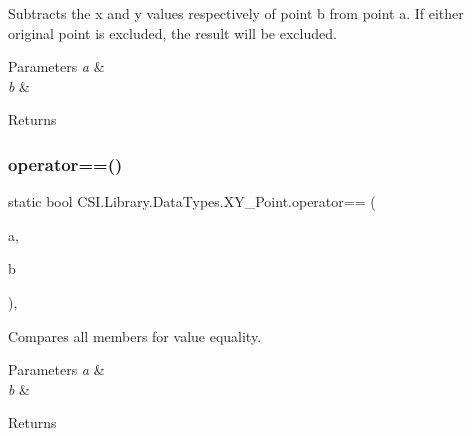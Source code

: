 Subtracts the x and y values respectively of point b from point a. If either original point is excluded, the result will be excluded. 


\begin{DoxyParams}{Parameters}
{\em a} & \\
\hline
{\em b} & \\
\hline
\end{DoxyParams}
\begin{DoxyReturn}{Returns}

\end{DoxyReturn}
\mbox{\label{struct_c_s_i_1_1_library_1_1_data_types_1_1_x_y___point_a31035324cc5360f8e897224137a60302}} 
\subsubsection{\texorpdfstring{operator==()}{operator==()}}
{\footnotesize\ttfamily static bool C\+S\+I.\+Library.\+Data\+Types.\+X\+Y\+\_\+\+Point.\+operator== (\begin{DoxyParamCaption}\item[{\mbox{\hyperlink{struct_c_s_i_1_1_library_1_1_data_types_1_1_x_y___point}{X\+Y\+\_\+\+Point}}}]{a,  }\item[{\mbox{\hyperlink{struct_c_s_i_1_1_library_1_1_data_types_1_1_x_y___point}{X\+Y\+\_\+\+Point}}}]{b }\end{DoxyParamCaption})\hspace{0.3cm}{\ttfamily [inline]}, {\ttfamily [static]}}



Compares all members for value equality. 


\begin{DoxyParams}{Parameters}
{\em a} & \\
\hline
{\em b} & \\
\hline
\end{DoxyParams}
\begin{DoxyReturn}{Returns}

\end{DoxyReturn}
\mbox{\label{struct_c_s_i_1_1_library_1_1_data_types_1_1_x_y___point_a64aacee12f90dd3b9653de9d677cc6c0}} 
